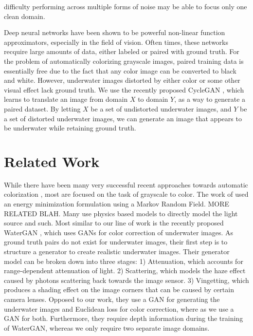 \documentclass[conference,reqno]{IEEEtran}
\begin{document}
\noindent difficulty performing across multiple forms of noise may be able to focus only one clean domain.

Deep neural networks have been shown to be powerful non-linear function approximators, especially in the field of
vision. Often times, these networks recquire large amounts of data, either labeled or paired with ground truth.
For the problem of automatically colorizing grayscale images, paired training data is essentially free due to the
fact that any color image can be converted to black and white. However, underwater images distorted by either color
or some other visual effect lack ground truth. We use the recently proposed CycleGAN \cite{zhu2017unpaired}, which
learns to translate an image from domain $X$ to domain $Y$, as a way to generate a paired dataset. By letting $X$ be
a set of undistorted underwater images, and $Y$ be a set of distorted underwater images, we can generate an image
that appears to be underwater while retaining ground truth.

\section{Related Work}

While there have been many very successful recent approaches towards automatic colorization
\cite{zhang2016colorful,iizuka2016let}, most are focused on the task of grayscale to color.
The work of \cite{torres2005color} used an energy minimization formulation using a Markov Random Field. 
MORE RELATED BLAH. Many use physics based models to directly model the light source and such.
Most similar to our line of work is the recently proposed WaterGAN \cite{li2017watergan}, which uses
GANs for color correction of underwater images. As ground truth pairs do not exist for underwater images,
their first step is to structure a generator to create realistic underwater images. Their generator model
can be broken down into three stages: 1) Attenuation, which accounts for range-dependent attenuation of light.
2) Scattering, which models the haze effect caused by photons scattering back towards the image sensor. 3)
Vingetting, which produces a shading effect on the image corners that can be caused by certain camera lenses.
Opposed to our work, they use a GAN for generating the underwater images and Euclidean loss for color correction,
where as we use a GAN for both. Furthermore, they require depth information during the training of WaterGAN,
whereas we only require two separate image domains.
\end{document}
